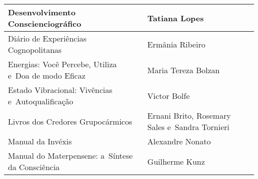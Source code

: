 \documentclass{gescons}
\begin{document}
\begin{longtable}[]{@{}
  >{\raggedright\arraybackslash}p{}
  >{\raggedright\arraybackslash}p{}@{}}
\begin{minipage}[b]{\linewidth}
Desenvolvimento Conscienciográfico
\end{minipage} & \begin{minipage}[b]{\linewidth}\raggedright
Tatiana Lopes
\end{minipage} \\
\hline
\begin{minipage}[b]{\linewidth}\raggedright
Diário de Experiências Cognopolitanas
\end{minipage} & \begin{minipage}[b]{\linewidth}\raggedright
Ermânia Ribeiro
\end{minipage} \\
\hline
\begin{minipage}[b]{\linewidth}\raggedright
Energias: Você Percebe, Utiliza e~Doa de modo Eficaz
\end{minipage} & \begin{minipage}[b]{\linewidth}\raggedright
Maria Tereza Bolzan
\end{minipage} \\
\hline
\begin{minipage}[b]{\linewidth}\raggedright
Estado Vibracional: Vivências e~Autoqualificação
\end{minipage} & \begin{minipage}[b]{\linewidth}\raggedright
Victor Bolfe
\end{minipage} \\
\hline
\begin{minipage}[b]{\linewidth}\raggedright
Livros dos Credores Grupocármicos
\end{minipage} & \begin{minipage}[b]{\linewidth}\raggedright
Ernani Brito, Rosemary Sales e~Sandra Tornieri
\end{minipage} \\
\hline
\begin{minipage}[b]{\linewidth}\raggedright
Manual da Invéxis
\end{minipage} & \begin{minipage}[b]{\linewidth}\raggedright
Alexandre Nonato
\end{minipage} \\
\hline
\begin{minipage}[b]{\linewidth}\raggedright
Manual do Materpensene: a~Síntese da Consciência
\end{minipage} & \begin{minipage}[b]{\linewidth}\raggedright
Guilherme Kunz
\end{minipage} \\

\end{longtable}
\end{document}
